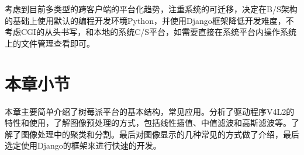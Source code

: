 考虑到目前多类型的跨客户端的平台化趋势，注重系统的可迁移，决定在B/S架构的基础上使用默认的编程开发环境Python，并使用Django框架降低开发难度，不考虑CGI的从头书写，和本地的系统C/S平台，如需要直接在系统平台内操作系统上的文件管理查看即可\cite{rasptcpip}。

\section{本章小节}
本章主要简单介绍了树莓派平台的基本结构，常见应用。分析了驱动程序V4L2的特性和使用，了解图像预处理的方式，包括线性插值、中值滤波和高斯滤波等。了解了图像处理中的聚类和分割。最后对图像显示的几种常见的方式做了介绍，最后选定使用Django的框架来进行快速的开发。